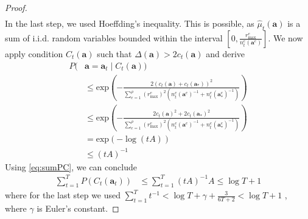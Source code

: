 \begin{proof}
\begin{equation*}
\begin{split}
\end{split}
\end{equation*}
In the last step, we used Hoeffding's inequality. This is possible, as $\hat{\mu}_t(\mathbf{a})$ is a sum of i.i.d. random variables bounded within the interval $\left[0, \frac{r_{\max}^e}{n^e_t(\mathbf{a}^e)}\right]$. We now apply condition $C_t(\mathbf{a})$ such that $\Delta(\mathbf{a}) > 2 c_t(\mathbf{a})$ and derive
\begin{align*}
P(& \mathbf{a} = \mathbf{a}_t \mid C_t(\mathbf{a}) )\\
& \le \text{exp}\left( -\frac{ 2 ( c_t(\mathbf{a}) + c_t(\mathbf{a}_*) )^2 }{ \sum_{e=1}^\rho (r_{\max}^e)^2 \left( n^e_t(\mathbf{a}^e)^{-1} + n^e_t(\mathbf{a}^e_*)^{-1} \right) } \right) \\
& \le \text{exp}\left( -\frac{ 2 c_t(\mathbf{a})^2 + 2 c_t(\mathbf{a}_*)^2 }{ \sum_{e=1}^\rho (r_{\max}^e)^2 \left( n^e_t(\mathbf{a}^e)^{-1} + n^e_t(\mathbf{a}^e_*)^{-1} \right) } \right) \\
& = \text{exp}\left( -\log( t A ) \right) \\
&\le (tA)^{-1}
\end{align*}
Using \eqref{eq:sumPC}, we can conclude
\begin{align}
\sum^T_{t=1} P(C_t(\mathbf{a}_t)) &\le \sum_{t=1}^T (tA)^{-1}A \le \log T + 1 \label{eq:first_term}
\end{align}
where for the last step we used $\sum_{t=1}^T t^{-1} < \log T + \gamma + \frac{3}{6T+2} < \log T + 1$ \cite{chen2003best}, where $\gamma$ is Euler's constant.


\end{proof}
